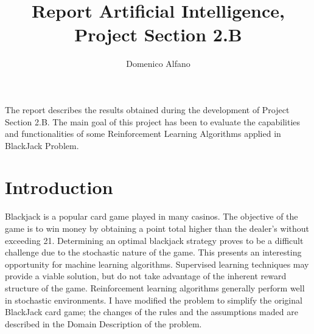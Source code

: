 \documentclass[11pt]{article}
\theoremstyle{plain}
\theoremstyle{definition}
\begin{document}
 
\title{Report Artificial Intelligence, Project Section 2.B}
\date{}
\author{Domenico Alfano}
\maketitle

The report describes the results obtained during the development of Project Section 2.B. The main goal of this project has been to evaluate the capabilities and functionalities of some Reinforcement Learning Algorithms applied in BlackJack Problem.

\section{Introduction}
Blackjack is a popular card game played in many casinos. The objective of the game is to win money by obtaining a point total higher than the dealer's without exceeding 21. Determining an optimal blackjack strategy proves to be a difficult challenge due to the stochastic nature of the game. This presents an interesting opportunity for machine learning algorithms. Supervised learning techniques may provide a viable solution, but do not take advantage of the inherent reward structure of the game. Reinforcement learning algorithms generally perform well in stochastic environments. I have modified the problem to simplify the original BlackJack card game; the changes of the rules and the assumptions maded are described in the Domain Description of the problem.
\end{document}
